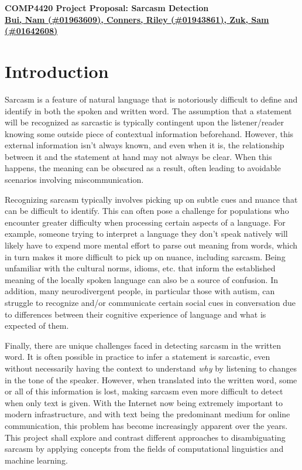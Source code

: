 \documentclass[11pt]{article}
\def\proptitle{COMP4420 Project Proposal: Sarcasm Detection}
\def\propauthors{Bui, Nam (\#01963609), 
                 Conners, Riley (\#01943861), 
                 Zuk, Sam (\#01642608)}
\begin{document}
\begin{center}
    \textbf{\Large{\proptitle}} \\
    \textbf{\underline{\propauthors}}
\end{center}

\bigskip

\section{Introduction}

Sarcasm is a feature of natural language that is notoriously difficult to
define and identify in both the spoken and written word. The assumption that a
statement will be recognized as sarcastic is typically contingent upon the
listener/reader knowing some outside piece of contextual information
beforehand. However, this external information isn't always known, and even
when it is, the relationship between it and the statement at hand may not
always be clear. When this happens, the meaning can be obscured as a result,
often leading to avoidable scenarios involving miscommunication.

Recognizing sarcasm typically involves picking up on subtle cues and nuance
that can be difficult to identify. This can often pose a challenge for
populations who encounter greater difficulty when processing certain aspects of
a language. For example, someone trying to interpret a language they don't
speak natively will likely have to expend more mental effort to parse out
meaning from words, which in turn makes it more difficult to pick up on nuance,
including sarcasm. Being unfamiliar with the cultural norms, idioms, etc. that
inform the established meaning of the locally spoken language can also be a
source of confusion. In addition, many neurodivergent people, in particular
those with autism, can struggle to recognize and/or communicate certain social
cues in conversation due to differences between their cognitive experience of
language and what is expected of them.

Finally, there are unique challenges faced in detecting sarcasm in the written
word. It is often possible in practice to infer a statement is sarcastic, even
without necessarily having the context to understand \textit{why} by listening
to changes in the tone of the speaker. However, when translated into the
written word, some or all of this information is lost, making sarcasm even more
difficult to detect when only text is given. With the Internet now being
extremely important to modern infrastructure, and with text being the
predominant medium for online communication, this problem has become
increasingly apparent over the years. This project shall explore and contrast
different approaches to disambiguating sarcasm by applying concepts from the
fields of computational linguistics and machine learning.
\end{document}
